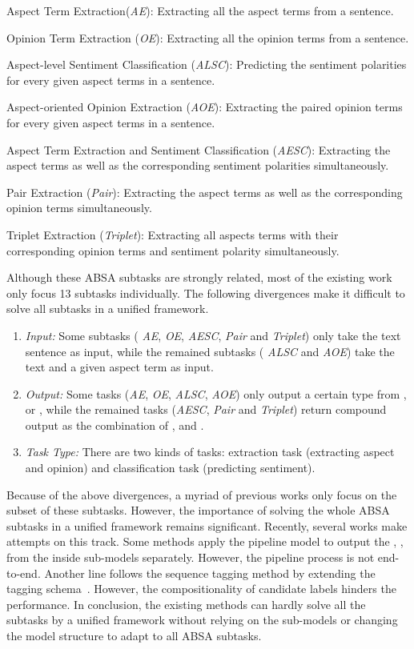 \documentclass[11pt,a4paper]{article}
\begin{document}
 Aspect Term Extraction(\emph{AE}): Extracting all the aspect terms from a sentence.

 Opinion Term Extraction (\emph{OE}): Extracting all the opinion terms from a sentence.

 Aspect-level Sentiment Classification (\emph{ALSC}): Predicting the sentiment polarities for every given aspect terms in a sentence.

 Aspect-oriented Opinion Extraction (\emph{AOE}): Extracting the paired opinion terms for every given aspect terms in a sentence.

 Aspect Term Extraction and  Sentiment Classification (\emph{AESC}): Extracting the aspect terms as well as the corresponding sentiment polarities simultaneously.

 Pair Extraction (\emph{Pair}):  Extracting the aspect terms as well as the corresponding opinion terms simultaneously.

 Triplet Extraction (\emph{Triplet}): Extracting all aspects terms with their corresponding opinion terms and sentiment polarity simultaneously.





Although these ABSA subtasks are strongly related, most of the existing work only focus 13 subtasks individually. The following divergences make it difficult to solve all subtasks in a unified framework.
\begin{enumerate}
\setlength{\itemsep}{1pt}\setlength{\parskip}{1pt}\item \textit{Input:} Some subtasks (  \emph{AE}, \emph{OE},  \emph{AESC},  \emph{Pair}  and \emph{Triplet}) only take the text sentence as input, while the remained subtasks ( \emph{ALSC} and \emph{AOE}) take the text and a given aspect term as input.
\item \textit{Output:}  Some tasks (\emph{AE},  \emph{OE}, \emph{ALSC}, \emph{AOE}) only output a certain type from ,  or , while the remained tasks (\emph{AESC}, \emph{Pair} and \emph{Triplet}) return compound output as the combination of ,  and .
  \item \textit{Task Type:} There are two kinds of tasks: extraction task (extracting aspect and opinion) and classification task (predicting sentiment).
\end{enumerate}



Because of the above divergences, a myriad of previous  works only focus on the subset of these subtasks. However, the importance of solving the whole ABSA subtasks in a unified framework remains significant. Recently, several works make attempts on this track.  Some methods\citep{DBLP:conf/aaai/PengXBHLS20,DBLP:journals/corr/abs-2101-00816} apply the pipeline model to output the , ,  from the inside sub-models separately. However, the pipeline process is  not end-to-end. Another line follows the sequence tagging method by extending the tagging schema~\citep{DBLP:conf/emnlp/XuLLB20}. However, the  compositionality of candidate labels hinders the performance. In conclusion, the existing methods can hardly solve all the subtasks by a unified framework  without relying on the sub-models or changing the model structure  to adapt to all ABSA subtasks.
\end{document}
